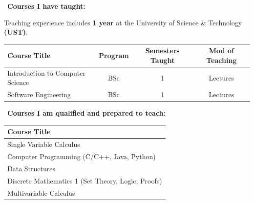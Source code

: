 \documentclass[a4paper,11pt]{article}
\begin{document}
	\footnotesize{
	\textbullet\ {\normalsize{\textbf{Courses I have taught:}}}\\
	\vspace{2mm} %

	Teaching experience includes \textbf{1 year} at the University of Science \& Technology \textbf{(UST)}.

	\vspace{2mm} %
	\renewcommand{\arraystretch}{1.5} %
	\setlength{\tabcolsep}{12pt} %
	\begin{tabularx}{\textwidth}{|X|c|c|c|}
		\hline
		\rowcolor[HTML]{CCCCCC} %
		\textbf{Course Title} & \textbf{Program} & \textbf{Semesters Taught} & \textbf{Mod of Teaching} \\
		\hline
		Introduction to Computer Science & BSc & 1 & Lectures\\
		\hline
		Software Engineering & BSc & 1 & Lectures\\
		\hline
	\end{tabularx}
	
	\vspace{4mm} %
	
	\textbullet\ {\normalsize{\textbf{Courses I am qualified and prepared to teach:}}}\\
	\vspace{2mm} %

	\renewcommand{\arraystretch}{1.5} %
	\setlength{\tabcolsep}{12pt} %
	\begin{tabularx}{\textwidth}{|X|}
		\hline
		\rowcolor[HTML]{CCCCCC} %
		\textbf{Course Title} \\
		\hline
		Single Variable Calculus\\
		\hline
		Computer Programming (C/C++, Java, Python)\\
		\hline
		Data Structures\\
		\hline
		Discrete Mathematics 1 (Set Theory, Logic, Proofs)\\
		\hline
		Multivariable Calculus\\
		\hline
	\end{tabularx}

	\vspace{2mm} %
	}
\end{document}
